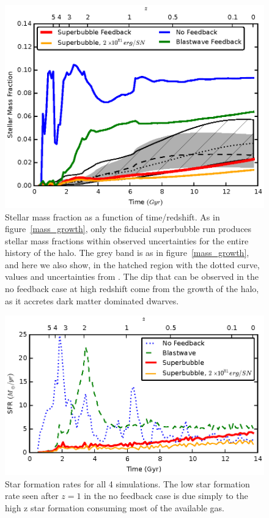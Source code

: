 \begin{figure}
    \includegraphics[width=\columnwidth]{figures2/stellar_fraction.eps}
    \caption[Stellar mass fraction evolution]{Stellar mass fraction as a
    function of time/redshift.  As in figure~\ref{mass_growth}, only the
    fiducial superbubble run produces stellar mass fractions within observed
    uncertainties for the entire history of the halo. The grey band is as in
    figure~\ref{mass_growth}, and here we also show, in the hatched region with
    the dotted curve, values and uncertainties from \citet{Moster2013}.  The dip
    that can be observed in the no feedback case at high redshift come from the
    growth of the halo, as it accretes dark matter dominated dwarves.}
    \label{stellar_fraction}
\end{figure}
\begin{figure}
    \includegraphics[width=\columnwidth]{figures2/sfr.eps}
    \caption[Star formation rate as a function of feedback model]{Star formation
    rates for all 4 simulations.  The low star formation rate seen after $z=1$
    in the no feedback case is due simply to the high z star formation consuming
    most of the available gas.}
    \label{sfr}
\end{figure}

